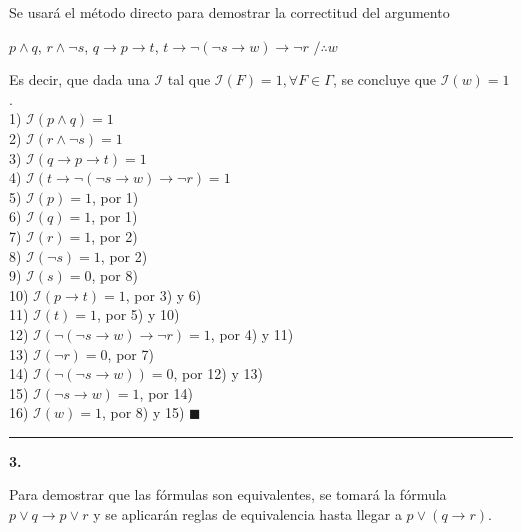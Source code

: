 \documentclass{article}
\begin{document}
\vspace{5mm}

Se usará el método directo para demostrar la correctitud del argumento

$p \land q$, $r \land \lnot s$, $q \rightarrow p \rightarrow t$, $t \rightarrow \lnot (\lnot s \rightarrow w) \rightarrow \lnot r$ $/ \therefore w$

Es decir, que dada una $\mathcal{I}$ tal que $\mathcal{I}(F) = 1, \forall F \in \Gamma$, se concluye que $\mathcal{I}(w) = 1$.\\
1) $\mathcal{I} (p \land q) = 1$\\
2) $\mathcal{I} (r \land \lnot s) = 1$\\
3) $\mathcal{I} (q \rightarrow p \rightarrow t) = 1$\\
4) $\mathcal{I} (t \rightarrow \lnot (\lnot s \rightarrow w) \rightarrow \lnot r) = 1$\\
5) $\mathcal{I} (p) = 1$, por 1)\\
6) $\mathcal{I} (q) = 1$, por 1)\\
7) $\mathcal{I} (r) = 1$, por 2)\\
8) $\mathcal{I} (\lnot s) = 1$, por 2)\\
9) $\mathcal{I} (s) = 0$, por 8)\\
10) $\mathcal{I} (p \rightarrow t) = 1$, por 3) y 6)\\
11) $\mathcal{I} (t) = 1$, por 5) y 10)\\
12) $\mathcal{I} (\lnot (\lnot s \rightarrow w) \rightarrow \lnot r) = 1$, por 4) y 11)\\
13) $\mathcal{I} (\lnot r) = 0$, por 7)\\
14) $\mathcal{I} (\lnot (\lnot s \rightarrow w)) = 0$, por 12) y 13)\\
15) $\mathcal{I} (\lnot s \rightarrow w) = 1$, por 14)\\
16) $\mathcal{I} (w) = 1$, por 8) y 15) $\blacksquare$

\vspace{5mm}

\rule{11.5cm}{0.1mm}

\textbf{3.}

Para demostrar que las fórmulas son equivalentes, se tomará la fórmula $p \lor q \rightarrow p \lor r$ y se aplicarán reglas de equivalencia hasta llegar a $p \lor (q \rightarrow r)$.
\end{document}
